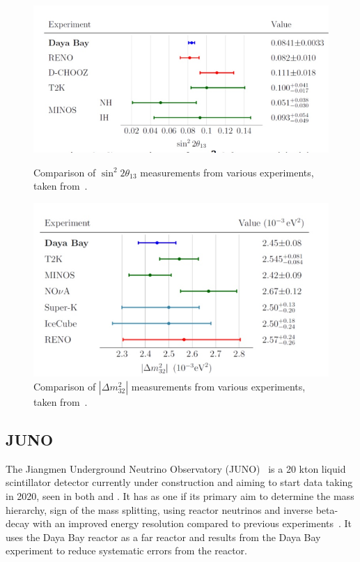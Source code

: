 \begin{figure}[h!]
  \centering
  \begin{minipage}[b]{0.49\textwidth}
    \includegraphics[width=\textwidth]{figures/db3.jpeg}
    \vspace{2mm}
    \caption{Comparison of $\sin^2 2\theta_{13}$ measurements from various experiments, taken from~\cite{74DayaBay}.}
    \label{fig:db3}
  \end{minipage}
  \hfill
  \begin{minipage}[b]{0.49\textwidth}
    \includegraphics[width=\textwidth]{figures/db4.jpeg}
       \vspace{2mm}
    \caption{Comparison of $|\Delta m^2_{32}|$ measurements from various experiments, taken from~\cite{74DayaBay}.}
     \label{fig:db4}
  \end{minipage}
\end{figure}

\subsection{JUNO}

The Jiangmen Underground Neutrino Observatory (JUNO)~\cite{75Juno} is a 20 kton liquid scintillator detector currently under construction and aiming to start data taking in 2020, seen in both  and . It has as one if its primary aim to determine the mass hierarchy, sign of the mass splitting, using reactor neutrinos and inverse beta-decay with an improved energy resolution compared to previous experiments~\cite{75Juno}. It uses the Daya Bay reactor as a far reactor and results from the Daya Bay experiment to reduce systematic errors from the reactor.

